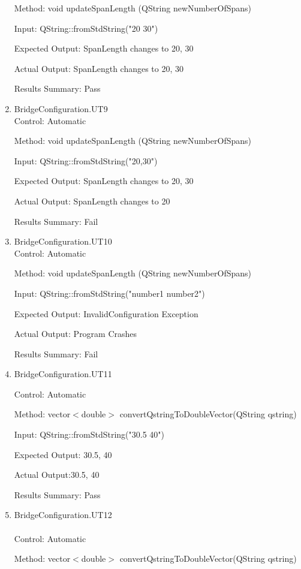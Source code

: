 \documentclass[12pt, titlepage]{article}
\begin{document}
\begin{enumerate}
    Method:  void updateSpanLength (QString newNumberOfSpans)
    
    Input: QString::fromStdString("20 30")
    
    Expected Output: SpanLength changes to {20, 30}

    Actual Output: SpanLength changes to {20, 30}

    Results Summary: Pass

    \item {BridgeConfiguration.UT9\\}
    Control: Automatic
    
    Method:  void updateSpanLength (QString newNumberOfSpans)
    
    Input: QString::fromStdString("20,30")
    
    Expected Output: SpanLength changes to {20, 30}

    Actual Output: SpanLength changes to {20}

    Results Summary: Fail

    \item {BridgeConfiguration.UT10\\}
    Control: Automatic
    
    Method:  void updateSpanLength (QString newNumberOfSpans)
    
    Input: QString::fromStdString("number1 number2")
    
    Expected Output: InvalidConfiguration Exception

    Actual Output: Program Crashes

    Results Summary: Fail

    \item {BridgeConfiguration.UT11\\}

    Control: Automatic
    
    Method:  vector$<$double$>$ convertQstringToDoubleVector(QString qstring)
    
    Input: QString::fromStdString("30.5 40")
    
    Expected Output: {30.5, 40}

    Actual Output:{30.5, 40}

    Results Summary: Pass

    \item {BridgeConfiguration.UT12\\\\}
    Control: Automatic
    
    Method:  vector$<$double$>$ convertQstringToDoubleVector(QString qstring)
    

\end{enumerate}
\end{document}
